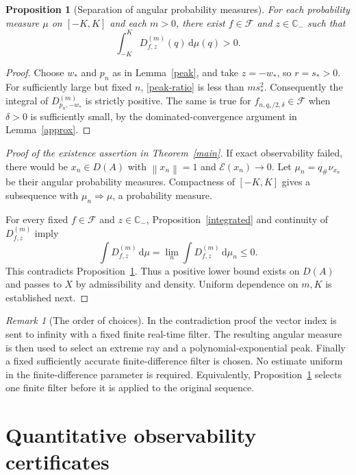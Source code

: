 \documentclass[11pt,a4paper]{article}
\newtheorem{proposition}[theorem]{Proposition}
\theoremstyle{definition}\newtheorem{definition}[theorem]{Definition}
\theoremstyle{remark}\newtheorem{remark}[theorem]{Remark}
\newcommand{\C}{\mathbb C}\newcommand{\R}{\mathbb R}\newcommand{\N}{\mathbb N}
\newcommand{\E}{\mathcal E}\newcommand{\D}{\mathcal D}
\newcommand{\F}{\mathcal F}\newcommand{\Prob}{\mathcal P}
\newcommand{\dd}{\,\mathrm d}
\newcommand{\norm}[1]{\left\lVert #1\right\rVert}
\begin{document}
\begin{proposition}[Separation of angular probability measures]\label{separation}
For each probability measure $\mu$ on $[-K,K]$ and each $m>0$, there exist $f\in\F$ and $z\in\C_-$ such that
\begin{equation}\label{strict-test}
 \int_{-K}^K D_{f,z}^{(m)}(q)\dd\mu(q)>0.
\end{equation}
\end{proposition}
\begin{proof}
Choose $w_*$ and $p_n$ as in Lemma~\ref{peak}, and take $z=-w_*$, so $r=s_*>0$. For sufficiently large but fixed $n$, \eqref{peak-ratio} is less than $m s_*^2$. Consequently the integral of $D_{p_n,-w_*}^{(m)}$ is strictly positive. The same is true for $f_{n,q_*/2,\delta}\in\F$ when $\delta>0$ is sufficiently small, by the dominated-convergence argument in Lemma~\ref{approx}.
\end{proof}

\begin{proof}[Proof of the existence assertion in Theorem~\ref{main}]
If exact observability failed, there would be $x_n\in D(A)$ with $\norm{x_n}=1$ and $\E(x_n)\to0$. Let $\mu_n=q_\#\nu_{x_n}$ be their angular probability measures. Compactness of $[-K,K]$ gives a subsequence with $\mu_n\Rightarrow\mu$, a probability measure.

For every fixed $f\in\F$ and $z\in\C_-$, Proposition~\ref{integrated} and continuity of $D_{f,z}^{(m)}$ imply
\[
 \int D_{f,z}^{(m)}\dd\mu
 =\lim_n\int D_{f,z}^{(m)}\dd\mu_n\le0.
\]
This contradicts Proposition~\ref{separation}. Thus a positive lower bound exists on $D(A)$ and passes to $X$ by admissibility and density. Uniform dependence on $m,K$ is established next.
\end{proof}

\begin{remark}[The order of choices]\label{limits}
In the contradiction proof the vector index is sent to infinity with a fixed finite real-time filter. The resulting angular measure is then used to select an extreme ray and a polynomial-exponential peak. Finally a fixed sufficiently accurate finite-difference filter is chosen. No estimate uniform in the finite-difference parameter is required. Equivalently, Proposition~\ref{separation} selects one finite filter before it is applied to the original sequence.
\end{remark}

\section{Quantitative observability certificates}\label{sec:quant}
\end{document}
